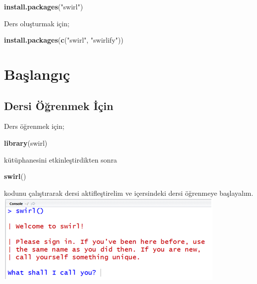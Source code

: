 \documentclass[]{book}
\newenvironment{Shaded}{\begin{snugshade}}{\end{snugshade}}
\newcommand{\KeywordTok}[1]{\textcolor[rgb]{0.13,0.29,0.53}{\textbf{#1}}}
\newcommand{\StringTok}[1]{\textcolor[rgb]{0.31,0.60,0.02}{#1}}
\newcommand{\NormalTok}[1]{#1}
\begin{document}
\begin{Shaded}
\begin{Highlighting}[]
\KeywordTok{install.packages}\NormalTok{(}\StringTok{"swirl"}\NormalTok{)}
\end{Highlighting}
\end{Shaded}

Ders oluşturmak için;

\begin{Shaded}
\begin{Highlighting}[]
\KeywordTok{install.packages}\NormalTok{(}\KeywordTok{c}\NormalTok{(}\StringTok{"swirl"}\NormalTok{, }\StringTok{"swirlify"}\NormalTok{))}
\end{Highlighting}
\end{Shaded}

\section{Başlangıç}\label{baslangc-2}

\subsection{Dersi Öğrenmek İçin}\label{dersi-ogrenmek-icin}

Ders öğrenmek için;

\begin{Shaded}
\begin{Highlighting}[]
\KeywordTok{library}\NormalTok{(swirl)}
\end{Highlighting}
\end{Shaded}

kütüphanesini etkinleştirdikten sonra

\begin{Shaded}
\begin{Highlighting}[]
\KeywordTok{swirl}\NormalTok{()}
\end{Highlighting}
\end{Shaded}

kodunu çalıştırarak dersi aktifleştirelim ve içersindeki dersi öğrenmeye
başlayalım. \includegraphics{resim10.png}
\end{document}

